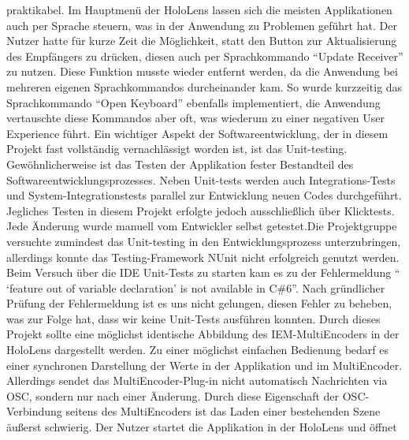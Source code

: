 \documentclass[11pt, titlepage, fleqn]{report}
\begin{document}
        	praktikabel. Im Hauptmenü der HoloLens lassen sich die meisten 
        	Applikationen auch per Sprache steuern, was in der Anwendung zu 
        	Problemen geführt hat. Der Nutzer hatte für kurze Zeit die 
        	Möglichkeit, statt den Button zur Aktualisierung des Empfängers zu 
        	drücken, diesen auch per Sprachkommando “Update Receiver” zu 
        	nutzen. Diese Funktion musste wieder entfernt werden, da die 
        	Anwendung bei mehreren eigenen Sprachkommandos durcheinander kam. 
        	So wurde kurzzeitig das Sprachkommando “Open Keyboard” ebenfalls 
        	implementiert, die Anwendung vertauschte diese Kommandos aber oft, 
        	was wiederum zu einer negativen User Experience führt.\newline
        	Ein wichtiger Aspekt der Softwareentwicklung, der in diesem Projekt 
        	fast vollständig vernachlässigt worden ist, ist das Unit-testing. 
        	Gewöhnlicherweise ist das Testen der Applikation fester Bestandteil 
        	des Softwareentwicklungsprozesses. Neben Unit-tests werden auch 
        	Integrations-Tests und System-Integrationstests parallel zur 
        	Entwicklung neuen Codes durchgeführt. Jegliches Testen in diesem 
        	Projekt erfolgte jedoch ausschließlich über Klicktests. Jede 
        	Änderung wurde manuell vom Entwickler selbst getestet.\newline Die 
        	Projektgruppe versuchte zumindest das Unit-testing in den 
        	Entwicklungsprozess unterzubringen, allerdings konnte das 
        	Testing-Framework NUnit nicht erfolgreich genutzt werden.
        	Beim Versuch über die IDE Unit-Tests zu starten kam es zu der 
        	Fehlermeldung “ ‘feature out of variable declaration’ is not 
        	available in C\#6”. Nach gründlicher Prüfung der Fehlermeldung ist 
        	es uns nicht gelungen, diesen Fehler zu beheben, was zur Folge hat, 
        	dass wir keine Unit-Tests ausführen konnten.\newline
        	Durch dieses Projekt sollte eine möglichst identische Abbildung des 
        	IEM-MultiEncoders in der HoloLens dargestellt werden. Zu einer 
        	möglichst einfachen Bedienung bedarf es einer synchronen 
        	Darstellung der Werte in der Applikation und im MultiEncoder. 
        	Allerdings sendet das MultiEncoder-Plug-in nicht automatisch 
        	Nachrichten via OSC, sondern nur nach einer Änderung.
        	Durch diese Eigenschaft der OSC-Verbindung seitens des 
        	MultiEncoders ist das Laden einer bestehenden Szene äußerst 
        	schwierig. 
        	Der Nutzer startet die Applikation in der HoloLens und öffnet 
\end{document}

